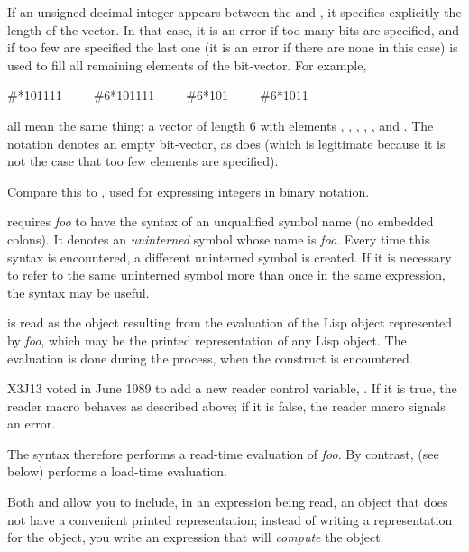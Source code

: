 \begin{flushdesc}
If an unsigned decimal integer appears between the \cd{\#} and \cdf{*},
it specifies explicitly the length of the vector.  In that case,
it is an error if too many bits are specified,
and if too few are specified the last one
(it is an error if there are none in this case)
is used to fill all remaining elements of the bit-vector.
For example,
\begin{lisp}
\#*101111~~~~~\#6*101111~~~~~\#6*101~~~~~\#6*1011
\end{lisp}
all mean the same thing: a vector of length 6 with elements , ,
, , , and .
The notation \cd{\#*} denotes an empty bit-vector, as does 
(which is legitimate because it is not the case that too few elements
are specified).
\begin{new}
Compare this to , used for expressing integers in binary notation.
\end{new}

\item[\cd{\#:}]
 requires {\it foo} to have the syntax of an unqualified
symbol name (no embedded colons).  It denotes an {\it uninterned} symbol
whose name is {\it foo}.  Every time this syntax is encountered, a different
uninterned symbol is created.  If it is necessary to refer to the
same uninterned symbol more than once in the same expression,
the \cd{\#=} syntax may be useful.

\item[\cd{\#.}]
 is read as the object resulting from the evaluation
of the Lisp object represented by {\it foo},
which may be the printed representation of any Lisp object.
The evaluation is done during the  process, when the 
construct is encountered.

\begin{newer}
X3J13 voted in June 1989  to add a new reader control variable,
.  If it is true,
the  reader macro behaves as described above;
if it is false, the  reader macro signals an error.
\end{newer}

The  syntax therefore performs a read-time evaluation of {\it foo}.
By contrast, \cd{\#,} (see below) performs a load-time evaluation.

Both  and \cd{\#,} allow you to include, in an expression
being read, an object that does not have a convenient printed
representation; instead of writing a representation for the object,
you write an expression that will {\it compute} the object.
\end{flushdesc}

